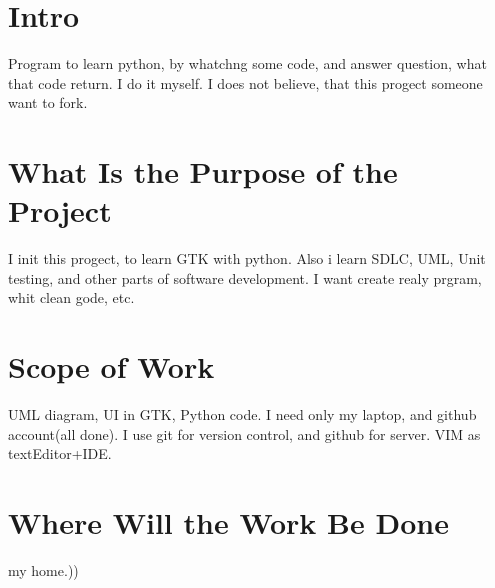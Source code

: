 \documentclass{article}
\begin{document}
  \section{Intro}
  Program to learn python, by whatchng some code, and answer question, what that code return. I do it myself. I does not believe, that this progect someone want to fork.

  \section{What Is the Purpose of the Project}
  I init this progect, to learn GTK with python. Also i learn SDLC, UML, Unit testing, and other parts of software development. I want create realy prgram, whit clean gode, etc.
  \section{Scope of Work}
  UML diagram, UI in GTK, Python code. I need only my laptop, and github account(all done). I use git for version control, and github for server. VIM as textEditor+IDE.
  \section{Where Will the Work Be Done}
  my home.))
\end{document}
